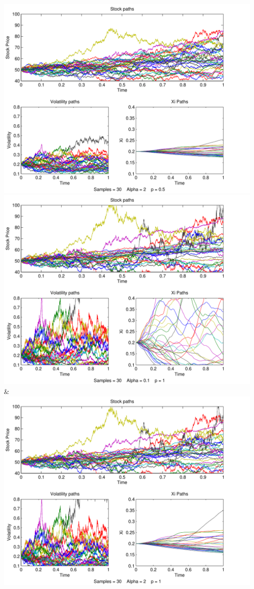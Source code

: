 \documentclass[a4paper,onecolumn,draft]{IEEEtran}
\begin{document}
{			 \includegraphics[width=\stockplotsize]{path_s30_a2_p0-5}\NN\cmidrule(lr){1-2}
		 \includegraphics[width=\stockplotsize]{path_s30_a0-1_p1}&
			 \includegraphics[width=\stockplotsize]{path_s30_a2_p1}\NN\cmidrule(lr){1-2}
}
\end{document}
